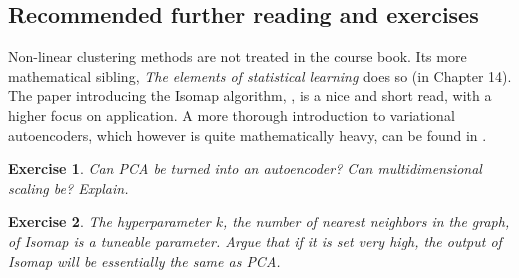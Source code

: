 \documentclass{article}
\newtheorem{exercise}{Exercise}
\begin{document}
\subsection{Recommended further reading and exercises}
Non-linear clustering methods are not treated in the course book. Its more mathematical sibling, \emph{The elements of statistical learning} \cite{hastieElements} does so (in Chapter 14). The paper introducing the Isomap algorithm, \cite{tenenbaum2000global}, is a nice and short read, with a higher focus on application. A more thorough introduction to variational autoencoders, which however is quite mathematically heavy, can be found in \cite{kingma2019introduction}. 

\begin{exercise}
    Can PCA be turned into an autoencoder? Can multidimensional scaling be? Explain.
\end{exercise}

\begin{exercise}
    The hyperparameter $k$, the number of nearest neighbors in the graph, of Isomap is a tuneable parameter. Argue that if it is set very high, the output of Isomap will be essentially the same as PCA.
\end{exercise}



\end{document}
